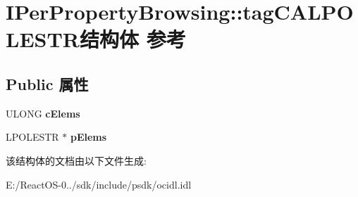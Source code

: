\hypertarget{struct_i_per_property_browsing_1_1tag_c_a_l_p_o_l_e_s_t_r}{}\section{I\+Per\+Property\+Browsing\+:\+:tag\+C\+A\+L\+P\+O\+L\+E\+S\+T\+R结构体 参考}
\label{struct_i_per_property_browsing_1_1tag_c_a_l_p_o_l_e_s_t_r}
\subsection*{Public 属性}
\begin{DoxyCompactItemize}
\item 
\mbox{\label{struct_i_per_property_browsing_1_1tag_c_a_l_p_o_l_e_s_t_r_a6fd871c2cb9d498d54d6f02992d6ce4a}} 
U\+L\+O\+NG {\bfseries c\+Elems}
\item 
\mbox{\label{struct_i_per_property_browsing_1_1tag_c_a_l_p_o_l_e_s_t_r_a28feab74c9700de6c226ca7eb2c372bd}} 
L\+P\+O\+L\+E\+S\+TR $\ast$ {\bfseries p\+Elems}
\end{DoxyCompactItemize}


该结构体的文档由以下文件生成\+:\begin{DoxyCompactItemize}
\item 
E\+:/\+React\+O\+S-\/0../sdk/include/psdk/ocidl.\+idl\end{DoxyCompactItemize}
